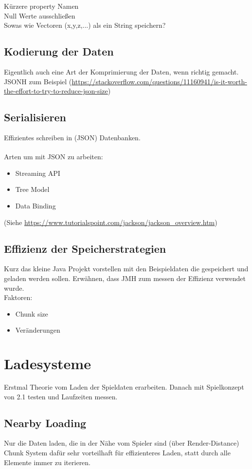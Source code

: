 Kürzere property Namen\\
Null Werte ausschließen\\
Sowas wie Vectoren (x,y,z,...) als ein String speichern?

\subsection{Kodierung der Daten}
Eigentlich auch eine Art der Komprimierung der Daten, wenn richtig gemacht.\\
JSONH zum Beispiel (\url{https://stackoverflow.com/questions/11160941/is-it-worth-the-effort-to-try-to-reduce-json-size})

\subsection{Serialisieren}
Effizientes schreiben in (JSON) Datenbanken.\\\\
Arten um mit JSON zu arbeiten:
\begin{itemize}
    \item Streaming API
    \item Tree Model
    \item Data Binding
\end{itemize}
(Siehe \url{https://www.tutorialspoint.com/jackson/jackson_overview.htm})

\subsection{Effizienz der Speicherstrategien}
Kurz das kleine Java Projekt vorstellen mit den Beispieldaten die gespeichert und geladen
werden sollen. Erwähnen, dass JMH zum messen der Effizienz verwendet wurde.\\

Faktoren:\\
\begin{itemize}
    \item Chunk size
    \item Veränderungen
\end{itemize}

\section{Ladesysteme}
Erstmal Theorie vom Laden der Spieldaten erarbeiten. Danach mit Spielkonzept
von 2.1 testen und Laufzeiten messen.

\subsection{Nearby Loading}
Nur die Daten laden, die in der Nähe vom Spieler sind (über Render-Distance)\\
Chunk System dafür sehr vorteilhaft für effizienteres Laden, statt durch alle Elemente
immer zu iterieren.

